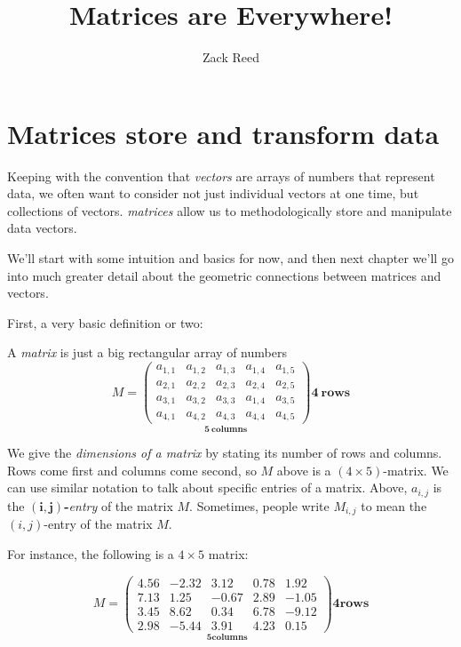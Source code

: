 \documentclass{ximera}
\author{Zack Reed} %
\title{Matrices are Everywhere!}
\begin{document}
\begin{abstract}

\end{abstract}
\maketitle


\section{Matrices store and transform data}

Keeping with the convention that \emph{vectors} are arrays of numbers that represent data, we often want to consider not just individual vectors at one time, but collections of vectors. \emph{matrices} allow us to methodologically store and manipulate data vectors.

We'll start with some intuition and basics for now, and then next chapter we'll go into much greater detail about the geometric connections between matrices and vectors.

First, a very basic definition or two:

\begin{definition}

A \emph{matrix} is just a big rectangular array of numbers
\[
M =
\underset{\displaystyle\boldsymbol{5}~\textbf{columns}}{\begin{pmatrix}
  a_{1,1} & a_{1,2} & a_{1,3} & a_{1,4} & a_{1,5} \\
  a_{2,1} & a_{2,2} & a_{2,3} & a_{2,4} & a_{2,5} \\
  a_{3,1} & a_{3,2} & a_{3,3} & a_{1,4} & a_{3,5} \\
  a_{4,1} & a_{4,2} & a_{4,3} & a_{4,4} & a_{4,5}
\end{pmatrix}}
\boldsymbol{4}~\textbf {rows}
\]

We give the \emph{dimensions of a matrix} by stating its number of rows
and columns. Rows come first and columns come second, so $M$ above is
a $(4\times 5)$-matrix. We can use similar notation to talk about
specific entries of a matrix. Above, $a_{i,j}$ is the
$\boldsymbol{(i,j)}${\bf-}\emph{entry} of the matrix $M$. Sometimes,
people write $M_{i,j}$ to mean the $(i,j)$-entry of the matrix $M$.

\end{definition}

For instance, the following is a $4\times 5$ matrix:

\[
M =
\underset{\displaystyle\boldsymbol{5}\textbf{columns}}{
\begin{pmatrix}
4.56 & -2.32 & 3.12 & 0.78 & 1.92 \\
7.13 & 1.25 & -0.67 & 2.89 & -1.05 \\
3.45 & 8.62 & 0.34 & 6.78 & -9.12 \\
2.98 & -5.44 & 3.91 & 4.23 & 0.15
\end{pmatrix}}
\boldsymbol{4}\textbf{rows}
\]
\end{document}
